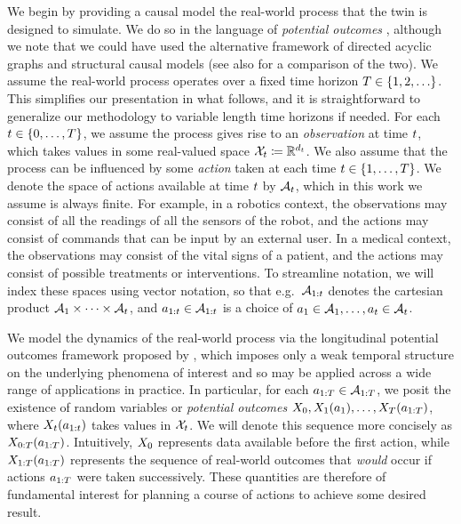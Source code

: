 We begin by providing a causal model the real-world process that the twin is designed to simulate.
We do so in the language of \emph{potential outcomes} \citep{rubin1974estimating,rubin2005causal}, although we note that we could have used the alternative framework of directed acyclic graphs and structural causal models \citep{pearl2009causality} (see also \cite{imbens2020potential} for a comparison of the two).
We assume the real-world process operates over a fixed time horizon $T \in \{1, 2, \ldots\}$.
This simplifies our presentation in what follows, and it is straightforward to generalize our methodology to variable length time horizons if needed.
For each $t \in \{0, \ldots, T\}$, we assume the process gives rise to an \emph{observation} at time $t$, which takes values in some real-valued space $\mathcal{X}_t \coloneqq \mathbb{R}^{d_t}$.
We also assume that the process can be influenced by some \emph{action} taken at each time $t \in \{1, \ldots, T\}$.
We denote the space of actions available at time $t$ by $\mathcal{A}_t$, which in this work we assume is always finite.
For example, in a robotics context, the observations may consist of all the readings of all the sensors of the robot, and the actions may consist of commands that can be input by an external user.
In a medical context, the observations may consist of the vital signs of a patient, and the actions may consist of possible treatments or interventions.
To streamline notation, we will index these spaces using vector notation, so that e.g.\ $\mathcal{A}_{1:t}$ denotes the cartesian product $\mathcal{A}_1 \times \cdots \times \mathcal{A}_t$, and $a_{1:t} \in \mathcal{A}_{1:t}$ is a choice of $a_1 \in \mathcal{A}_1, \ldots, a_t \in \mathcal{A}_t$.

We model the dynamics of the real-world process via the longitudinal potential outcomes framework proposed by \cite{robins1986new}, which imposes only a weak temporal structure on the underlying phenomena of interest and so may be applied across a wide range of applications in practice.
In particular, for each $a_{1:T} \in \mathcal{A}_{1:T}$, we posit the existence of random variables or \emph{potential outcomes} $X_0, X_1(a_1), \ldots, X_T(a_{1:T})$, where $X_t(a_{1:t})$ takes values in $\mathcal{X}_t$.
We will denote this sequence more concisely as $X_{0:T}(a_{1:T})$.
Intuitively, $X_0$ represents data available before the first action, while $X_{1:T}(a_{1:T})$ represents the sequence of real-world outcomes that \emph{would} occur if actions $a_{1:T}$ were taken successively.
These quantities are therefore of fundamental interest for planning a course of actions to achieve some desired result.

